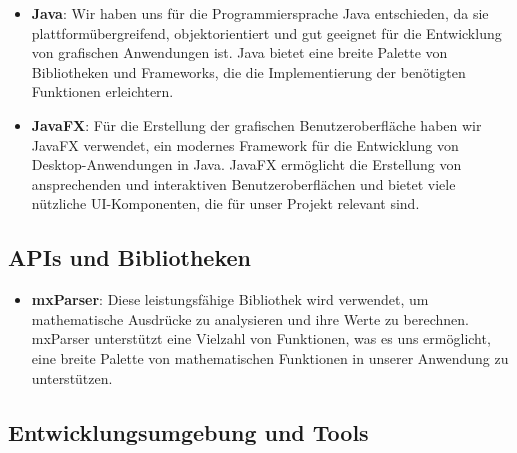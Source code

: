 \documentclass[a4paper]{article}
\begin{document}
\begin{itemize}
	\item \textbf{Java}: Wir haben uns für die Programmiersprache Java entschieden, da sie plattformübergreifend, objektorientiert und gut geeignet für die Entwicklung von grafischen Anwendungen ist. Java bietet eine breite Palette von Bibliotheken und Frameworks, die die Implementierung der benötigten Funktionen erleichtern.

	\item \textbf{JavaFX}: Für die Erstellung der grafischen Benutzeroberfläche haben wir JavaFX verwendet, ein modernes Framework für die Entwicklung von Desktop-Anwendungen in Java. JavaFX ermöglicht die Erstellung von ansprechenden und interaktiven Benutzeroberflächen und bietet viele nützliche UI-Komponenten, die für unser Projekt relevant sind.
\end{itemize}

\subsection{APIs und Bibliotheken}

\begin{itemize}
	\item \textbf{mxParser}: Diese leistungsfähige Bibliothek wird verwendet, um mathematische Ausdrücke zu analysieren und ihre Werte zu berechnen. mxParser unterstützt eine Vielzahl von Funktionen, was es uns ermöglicht, eine breite Palette von mathematischen Funktionen in unserer Anwendung zu unterstützen.
\end{itemize}

\subsection{Entwicklungsumgebung und Tools}
\end{document}
